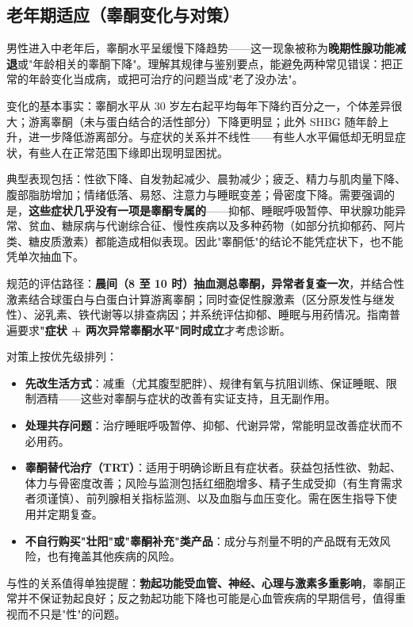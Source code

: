 \documentclass[12pt,a4paper,twoside]{ctexbook}
\newcommand{\keyword}[1]{\textbf{#1}}
\begin{document}
\subsection{老年期适应（睾酮变化与对策）}

男性进入中老年后，睾酮水平呈缓慢下降趋势——这一现象被称为\keyword{晚期性腺功能减退}或"年龄相关的睾酮下降"。理解其规律与鉴别要点，能避免两种常见错误：把正常的年龄变化当成病，或把可治疗的问题当成"老了没办法"。

变化的基本事实：睾酮水平从 30 岁左右起平均每年下降约百分之一，个体差异很大；游离睾酮（未与蛋白结合的活性部分）下降更明显；此外 SHBG 随年龄上升，进一步降低游离部分。与症状的关系并不线性——有些人水平偏低却无明显症状，有些人在正常范围下缘即出现明显困扰。

典型表现包括：性欲下降、自发勃起减少、晨勃减少；疲乏、精力与肌肉量下降、腹部脂肪增加；情绪低落、易怒、注意力与睡眠变差；骨密度下降。需要强调的是，\keyword{这些症状几乎没有一项是睾酮专属的}——抑郁、睡眠呼吸暂停、甲状腺功能异常、贫血、糖尿病与代谢综合征、慢性疾病以及多种药物（如部分抗抑郁药、阿片类、糖皮质激素）都能造成相似表现。因此"睾酮低"的结论不能凭症状下，也不能凭单次抽血下。

规范的评估路径：\keyword{晨间（8 至 10 时）抽血测总睾酮，异常者复查一次}，并结合性激素结合球蛋白与白蛋白计算游离睾酮；同时查促性腺激素（区分原发性与继发性）、泌乳素、铁代谢等以排查病因；并系统评估抑郁、睡眠与用药情况。指南普遍要求\keyword{"症状 + 两次异常睾酮水平"同时成立}才考虑诊断。

对策上按优先级排列：

\begin{itemize}
  \item \keyword{先改生活方式}：减重（尤其腹型肥胖）、规律有氧与抗阻训练、保证睡眠、限制酒精——这些对睾酮与症状的改善有实证支持，且无副作用。
  \item \keyword{处理共存问题}：治疗睡眠呼吸暂停、抑郁、代谢异常，常能明显改善症状而不必用药。
  \item \keyword{睾酮替代治疗（TRT）}：适用于明确诊断且有症状者。获益包括性欲、勃起、体力与骨密度改善；风险与监测包括红细胞增多、精子生成受抑（有生育需求者须谨慎）、前列腺相关指标监测、以及血脂与血压变化。需在医生指导下使用并定期复查。
  \item \keyword{不自行购买"壮阳"或"睾酮补充"类产品}：成分与剂量不明的产品既有无效风险，也有掩盖其他疾病的风险。
\end{itemize}

与性的关系值得单独提醒：\keyword{勃起功能受血管、神经、心理与激素多重影响}，睾酮正常并不保证勃起良好；反之勃起功能下降也可能是心血管疾病的早期信号，值得重视而不只是"性"的问题。
\end{document}
